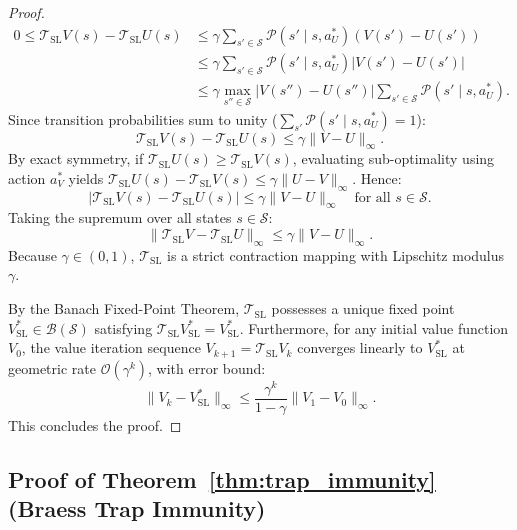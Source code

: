 \documentclass[11pt,a4paper]{article}
\begin{document}
\begin{proof}
\begin{align}
0 \le \mathcal{T}_{\text{SL}} V(s) - \mathcal{T}_{\text{SL}} U(s) &\le \gamma \sum_{s' \in \mathcal{S}} \mathcal{P}(s' \mid s, a_U^*) \left( V(s') - U(s') \right) \\
&\le \gamma \sum_{s' \in \mathcal{S}} \mathcal{P}(s' \mid s, a_U^*) \left| V(s') - U(s') \right| \\
&\le \gamma \max_{s'' \in \mathcal{S}} \left| V(s'') - U(s'') \right| \sum_{s' \in \mathcal{S}} \mathcal{P}(s' \mid s, a_U^*).
\end{align}
Since transition probabilities sum to unity ($\sum_{s'} \mathcal{P}(s' \mid s, a_U^*) = 1$):
\begin{equation}
\mathcal{T}_{\text{SL}} V(s) - \mathcal{T}_{\text{SL}} U(s) \le \gamma \|V - U\|_\infty.
\end{equation}
By exact symmetry, if $\mathcal{T}_{\text{SL}} U(s) \ge \mathcal{T}_{\text{SL}} V(s)$, evaluating sub-optimality using action $a_V^*$ yields $\mathcal{T}_{\text{SL}} U(s) - \mathcal{T}_{\text{SL}} V(s) \le \gamma \|U - V\|_\infty$. Hence:
\begin{equation}
\left| \mathcal{T}_{\text{SL}} V(s) - \mathcal{T}_{\text{SL}} U(s) \right| \le \gamma \|V - U\|_\infty \quad \text{for all } s \in \mathcal{S}.
\end{equation}
Taking the supremum over all states $s \in \mathcal{S}$:
\begin{equation}
\|\mathcal{T}_{\text{SL}} V - \mathcal{T}_{\text{SL}} U\|_\infty \le \gamma \|V - U\|_\infty.
\end{equation}
Because $\gamma \in (0, 1)$, $\mathcal{T}_{\text{SL}}$ is a strict contraction mapping with Lipschitz modulus $\gamma$.

By the Banach Fixed-Point Theorem, $\mathcal{T}_{\text{SL}}$ possesses a unique fixed point $V_{\text{SL}}^* \in \mathcal{B}(\mathcal{S})$ satisfying $\mathcal{T}_{\text{SL}} V_{\text{SL}}^* = V_{\text{SL}}^*$. Furthermore, for any initial value function $V_0$, the value iteration sequence $V_{k+1} = \mathcal{T}_{\text{SL}} V_k$ converges linearly to $V_{\text{SL}}^*$ at geometric rate $\mathcal{O}(\gamma^k)$, with error bound:
\begin{equation}
\|V_k - V_{\text{SL}}^*\|_\infty \le \frac{\gamma^k}{1 - \gamma} \|V_1 - V_0\|_\infty.
\end{equation}
This concludes the proof.
\end{proof}

\subsection{Proof of Theorem~\ref{thm:trap_immunity} (Braess Trap Immunity)}
\label{subsec:proof_thm3}
\end{document}
